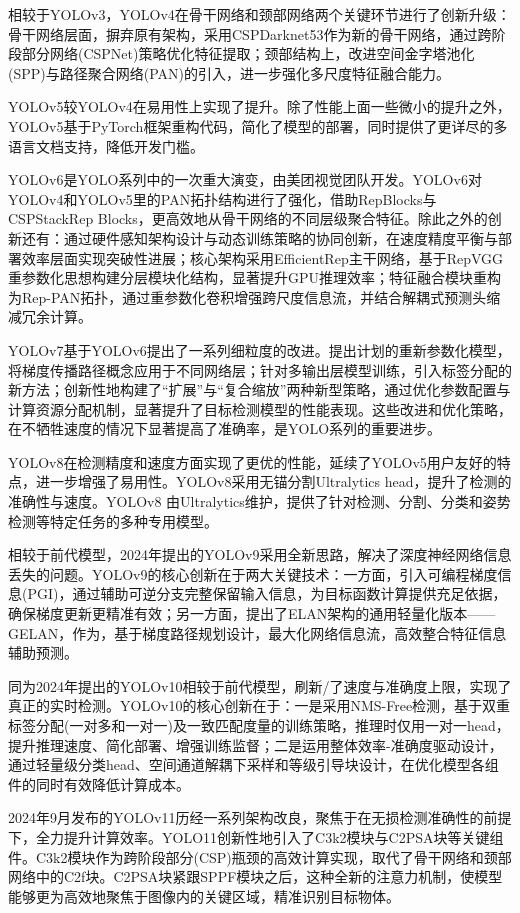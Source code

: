 相较于YOLOv3，YOLOv4\cite{yolov4}在骨干网络和颈部网络两个关键环节进行了创新升级：骨干网络层面，摒弃原有架构，采用CSPDarknet53作为新的骨干网络，通过跨阶段部分网络(CSPNet)策略优化特征提取；颈部结构上，改进空间金字塔池化(SPP)与路径聚合网络(PAN)的引入，进一步强化多尺度特征融合能力。

YOLOv5较YOLOv4在易用性上实现了提升。除了性能上面一些微小的提升之外，YOLOv5基于PyTorch框架重构代码，简化了模型的部署，同时提供了更详尽的多语言文档支持，降低开发门槛。

YOLOv6是YOLO系列中的一次重大演变，由美团视觉团队开发\cite{yolov6}。YOLOv6对YOLOv4和YOLOv5里的PAN拓扑结构进行了强化，借助RepBlocks与CSPStackRep Blocks，更高效地从骨干网络的不同层级聚合特征。除此之外的创新还有：通过硬件感知架构设计与动态训练策略的协同创新，在速度精度平衡与部署效率层面实现突破性进展；核心架构采用EfficientRep主干网络，基于RepVGG重参数化思想构建分层模块化结构，显著提升GPU推理效率；特征融合模块重构为Rep-PAN拓扑，通过重参数化卷积增强跨尺度信息流，并结合解耦式预测头缩减冗余计算。

YOLOv7基于YOLOv6提出了一系列细粒度的改进\cite{yolov7}。提出计划的重新参数化模型，将梯度传播路径概念应用于不同网络层；针对多输出层模型训练，引入标签分配的新方法；创新性地构建了“扩展”与“复合缩放”两种新型策略，通过优化参数配置与计算资源分配机制，显著提升了目标检测模型的性能表现。这些改进和优化策略，在不牺牲速度的情况下显著提高了准确率，是YOLO系列的重要进步。

YOLOv8在检测精度和速度方面实现了更优的性能，延续了YOLOv5用户友好的特点，进一步增强了易用性。YOLOv8采用无锚分割Ultralytics head，提升了检测的准确性与速度。YOLOv8 由Ultralytics维护，提供了针对检测、分割、分类和姿势检测等特定任务的多种专用模型。

相较于前代模型，2024年提出的YOLOv9采用全新思路，解决了深度神经网络信息丢失的问题\cite{yolov9}。YOLOv9的核心创新在于两大关键技术：一方面，引入可编程梯度信息(PGI)，通过辅助可逆分支完整保留输入信息，为目标函数计算提供充足依据，确保梯度更新更精准有效；另一方面，提出了ELAN架构的通用轻量化版本——GELAN，作为，基于梯度路径规划设计，最大化网络信息流，高效整合特征信息辅助预测。

同为2024年提出的YOLOv10相较于前代模型，刷新/了速度与准确度上限，实现了真正的实时检测\cite{yolov10}。YOLOv10的核心创新在于：一是采用NMS-Free检测，基于双重标签分配(一对多和一对一)及一致匹配度量的训练策略，推理时仅用一对一head，提升推理速度、简化部署、增强训练监督；二是运用整体效率-准确度驱动设计，通过轻量级分类head、空间通道解耦下采样和等级引导块设计，在优化模型各组件的同时有效降低计算成本。

2024年9月发布的YOLOv11历经一系列架构改良，聚焦于在无损检测准确性的前提下，全力提升计算效率。YOLO11创新性地引入了C3k2模块与C2PSA块等关键组件。C3k2模块作为跨阶段部分(CSP)瓶颈的高效计算实现，取代了骨干网络和颈部网络中的C2f块。C2PSA块紧跟SPPF模块之后，这种全新的注意力机制，使模型能够更为高效地聚焦于图像内的关键区域，精准识别目标物体。




